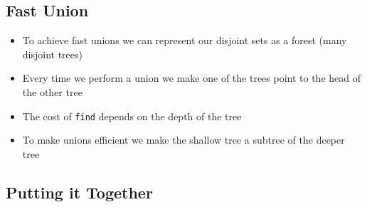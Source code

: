 
\begin{slide}
\section{Fast Union}

\begin{PauseHighLight}
  \begin{itemize}
  \item To achieve fast unions we can represent our disjoint sets as a
    forest (many disjoint trees)\pause
  \item Every time we perform a union we make one of the trees point to
    the head of the other tree\pause
  \item The cost of \texttt{find} depends on the depth of the tree\pause
  \item To make unions efficient we make the shallow tree a subtree of
    the deeper tree\pause
  \end{itemize}
\end{PauseHighLight}

\end{slide}



\begin{slide}
\section[-2]{Putting it Together}
\pb

\begin{center}
  \pause
\end{center}

\end{slide}


